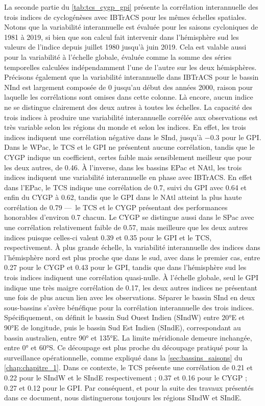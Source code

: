 \documentclass[../main.tex]{subfiles}
\begin{document}
La seconde partie du \cref{tab:tcs_cygp_gpi} présente la corrélation interannuelle des trois indices de cyclogénèses avec IBTrACS pour les mêmes échelles
spatiales. Notons que la variabilité interannuelle est évaluée pour les saisons cycloniques de \num{1981} à \num{2019}, si bien que son calcul fait intervenir
dans l'hémisphère sud les valeurs de l'indice depuis juillet 1980 jusqu'à juin 2019. Cela est valable aussi pour la variabilité à l'échelle globale, évaluée
comme la somme des séries temporelles calculées indépendamment l'une de l'autre sur les deux hémisphères. Précisons également que la variabilité interannuelle
dans IBTrACS pour le bassin NInd est largement composée de \num{0} jusqu'au début des années 2000, raison pour laquelle les corrélations sont omises dans cette
colonne. Là encore, aucun indice ne se distingue clairement des deux autres à toutes les échelles. La capacité des trois indices à produire une variabilité
interannuelle corrélée aux observations est très variable selon les régions du monde et selon les indices. En effet, les trois indices indiquent une corrélation
négative dans le SInd, jusqu'à \num{-0.3} pour le GPI. Dans le WPac, le TCS et le GPI ne présentent aucune corrélation, tandis que le CYGP indique un
coefficient, certes faible mais sensiblement meilleur que pour les deux autres, de \num{0.46}. À l'inverse, dans les bassins EPac et NAtl, les trois indices
indiquent une variabilité interannuelle en phase avec IBTrACS. En effet dans l'EPac, le TCS indique une corrélation de \num{0.7}, suivi du GPI avec \num{0.64}
et enfin du CYGP à \num{0.62}, tandis que le GPI dans le NAtl atteint la plus haute corrélation de \num{0.79} ---~le TCS et le CYGP présentant des performances
honorables d'environ \num{0.7} chacun. Le CYGP se distingue aussi dans le SPac avec une corrélation relativement faible de \num{0.57}, mais meilleure que les
deux autres indices puisque celles-ci valent \num{0.39} et \num{0.35} pour le GPI et le TCS, respectivement. À plus grande échelle, la variabilité interannuelle
des indices dans l'hémisphère nord est plus proche que dans le sud, avec dans le premier cas, entre \num{0.27} pour le CYGP et \num{0.43} pour le GPI, tandis
que dans l'hémisphère sud les trois indices indiquent une corrélation quasi-nulle. À l'échelle globale, seul le GPI indique une très maigre corrélation de
\num{0.17}, les deux autres indices ne présentant une fois de plus aucun lien avec les observations. Séparer le bassin SInd en deux sous-bassins s'avère
bénéfique pour la corrélation interannuelle des trois indices. Spécifiquement, on définit le bassin Sud Ouest Indien (SIndW) entre \ang{20}E et \ang{90}E de
longitude, puis le bassin Sud Est Indien (SIndE), correspondant au bassin australien, entre \ang{90} et \ang{135}E. La limite méridionale demeure inchangée,
entre \ang{0} et \ang{60}S. Ce découpage est plus proche du découpage pratiqué pour la surveillance opérationnelle, comme expliqué dans la
\cref{sec:bassins_saisons} du \cref{chap:chapitre_1}. Dans ce contexte, le TCS présente une corrélation de \num{0.21} et \num{0.22} pour le SIndW et le SIndE
respectivement ; \num{0.37} et \num{0.16} pour le CYGP ; \num{0.27} et \num{0.12} pour le GPI. Par conséquent, et pour la suite des travaux présentés dans ce
document, nous distinguerons toujours les régions SIndW et SIndE.
\end{document}
